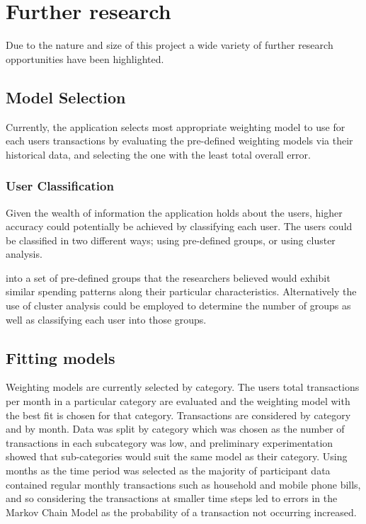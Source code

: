 \section{Further research}
Due to the nature and size of this project a wide variety of further research opportunities have been highlighted.

\subsection{Model Selection}
Currently, the application selects most appropriate weighting model to use for each users transactions by evaluating the pre-defined weighting models via their historical data, and selecting the one with the least total overall error.

\subsubsection{User Classification}
Given the wealth of information the application holds about the users, higher accuracy could potentially be achieved by classifying each user. The users could be classified in two different ways; using pre-defined groups, or using cluster analysis. 

into a set of pre-defined groups that the researchers believed would exhibit similar spending patterns along their particular characteristics. Alternatively the use of cluster analysis could be employed to determine the number of groups as well as classifying each user into those groups.

\subsection{Fitting models}
\label{section:overfittingmodels}
Weighting models are currently selected by category. The users total transactions per month in a particular category are evaluated and the weighting model with the best fit is chosen for that category.  Transactions are considered by category and by month. Data was split by category which was chosen as the number of transactions in each subcategory was low, and preliminary experimentation showed that  sub-categories would suit the same model as their category. Using months as the time period was selected as the majority of participant data contained regular monthly transactions such as household and mobile phone bills, and so considering the transactions at smaller time steps led to errors in the Markov Chain Model as the probability of a transaction not occurring increased.

